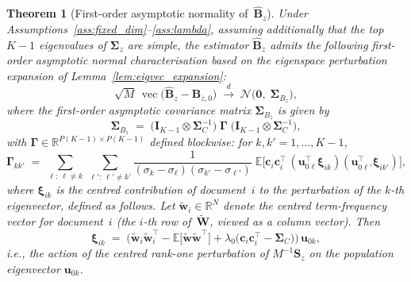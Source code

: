 \documentclass{article}
\newtheorem{theorem}{Theorem}
\DeclareMathOperator{\vect}{vec}
\begin{document}
\begin{theorem}[First-order asymptotic normality of~$\hat{\mathbf{B}}_z$]
\label{thm:normality}
Under Assumptions~\ref{ass:fixed_dim}--\ref{ass:lambda}, assuming
additionally that the top $K{-}1$ eigenvalues of
$\boldsymbol{\Sigma}_z$ are simple, the estimator
$\hat{\mathbf{B}}_z$ admits the following first-order asymptotic
normal characterisation based on the eigenspace perturbation expansion
of Lemma~\ref{lem:eigvec_expansion}:
\begin{equation}
  \sqrt{M}\,\vect\!\bigl(\hat{\mathbf{B}}_z - \mathbf{B}_{z,0}\bigr)
  \;\xrightarrow{d}\;
  \mathcal{N}\!\bigl(\mathbf{0},\;\boldsymbol{\Sigma}_{B_z}\bigr),
  \label{eq:Bz_clt}
\end{equation}
where the first-order asymptotic covariance matrix
$\boldsymbol{\Sigma}_{B_z}$ is given by
\begin{equation}
  \boldsymbol{\Sigma}_{B_z}
  \;=\;
  \bigl(\mathbf{I}_{K-1}\otimes\boldsymbol{\Sigma}_C^{-1}\bigr)
  \;\boldsymbol{\Gamma}\;
  \bigl(\mathbf{I}_{K-1}\otimes\boldsymbol{\Sigma}_C^{-1}\bigr),
  \label{eq:Sigma_Bz}
\end{equation}
with $\boldsymbol{\Gamma}\in\mathbb{R}^{P(K-1)\times P(K-1)}$
defined blockwise: for $k,k'=1,\dots,K{-}1$,
\begin{equation}
  \boldsymbol{\Gamma}_{kk'}
  \;=\;
  \sum_{\ell:\,\ell\neq k}\;
  \sum_{\ell':\,\ell'\neq k'}
  \frac{1}{(\sigma_k-\sigma_\ell)(\sigma_{k'}-\sigma_{\ell'})}
  \;\mathbb{E}\!\bigl[
    \mathbf{c}_i\mathbf{c}_i^{\!\top}\,
    (\mathbf{u}_{0\ell}^{\!\top}\boldsymbol{\xi}_{ik})
    (\mathbf{u}_{0\ell'}^{\!\top}\boldsymbol{\xi}_{ik'})
  \bigr],
  \label{eq:Gamma_block}
\end{equation}
where $\boldsymbol{\xi}_{ik}$ is the centred contribution of
document~$i$ to the perturbation of the $k$-th eigenvector, defined as
follows. Let $\widetilde{\mathbf{w}}_i\in\mathbb{R}^N$ denote the
centred term-frequency vector for document~$i$ (the $i$-th row
of~$\widetilde{\mathbf{W}}$, viewed as a column vector). Then
\begin{equation}
  \boldsymbol{\xi}_{ik}
  \;=\;
  \bigl(
    \widetilde{\mathbf{w}}_i\widetilde{\mathbf{w}}_i^{\!\top}
    - \mathbb{E}\bigl[
        \widetilde{\mathbf{w}}\widetilde{\mathbf{w}}^{\!\top}
      \bigr]
    + \lambda_0\bigl(
        \mathbf{c}_i\mathbf{c}_i^{\!\top}
        - \boldsymbol{\Sigma}_C
      \bigr)
  \bigr)\,\mathbf{u}_{0k},
  \label{eq:xi_ik}
\end{equation}
i.e., the action of the centred rank-one perturbation of $M^{-1}\mathbf{S}_z$
on the population eigenvector $\mathbf{u}_{0k}$.
\end{theorem}
\end{document}
